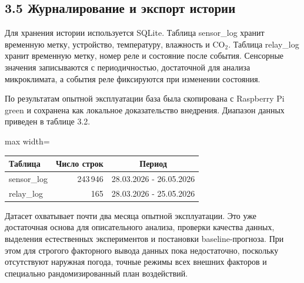 \documentclass[a4paper,14pt]{extarticle}
\newenvironment{vkrlongtab}[1]
  {\par\nopagebreak\vspace{-12pt}\noindent\begingroup
   \centering\singlespacing\small
   \hyphenpenalty=200\relax\exhyphenpenalty=200\relax\hbadness=10000\relax
   \begin{adjustbox}{max width=\linewidth}\begin{tabular}{#1}}
  {\end{tabular}\end{adjustbox}\par\endgroup\vspace{6pt}}
\renewcommand{\texttt}[1]{\textnormal{#1}}
\begin{document}
\hypertarget{ux436ux443ux440ux43dux430ux43bux438ux440ux43eux432ux430ux43dux438ux435-ux438-ux44dux43aux441ux43fux43eux440ux442-ux438ux441ux442ux43eux440ux438ux438}{%
\subsection{3.5 Журналирование и экспорт
истории}\label{ux436ux443ux440ux43dux430ux43bux438ux440ux43eux432ux430ux43dux438ux435-ux438-ux44dux43aux441ux43fux43eux440ux442-ux438ux441ux442ux43eux440ux438ux438}}

Для хранения истории используется SQLite. Таблица \texttt{sensor\_log}
хранит временную метку, устройство, температуру, влажность и CO\(_2\).
Таблица \texttt{relay\_log} хранит временную метку, номер реле и
состояние после события. Сенсорные значения записываются с
периодичностью, достаточной для анализа микроклимата, а события реле
фиксируются при изменении состояния.

По результатам опытной эксплуатации база была скопирована с Raspberry Pi
\texttt{green} и сохранена как локальное доказательство внедрения.
Диапазон данных приведен в таблице 3.2.

\par\vspace{10pt}\noindent\begin{minipage}{\linewidth}
\nopagebreak
\begin{vkrlongtab}{|l|r|c|}
\hline
\textbf{Таблица} & \textbf{Число строк} & \textbf{Период} \\
\hline

\texttt{sensor\_log} & 243\,946 & 28.03.2026 - 26.05.2026 \\
\hline
\texttt{relay\_log} & 165 & 28.03.2026 - 25.05.2026 \\
\hline
\end{vkrlongtab}
\end{minipage}\par\vspace{10pt}

Датасет охватывает почти два месяца опытной эксплуатации. Это уже
достаточная основа для описательного анализа, проверки качества данных,
выделения естественных экспериментов и постановки baseline-прогноза. При
этом для строгого факторного вывода данных пока недостаточно, поскольку
отсутствуют наружная погода, точные режимы всех внешних факторов и
специально рандомизированный план воздействий.
\end{document}
